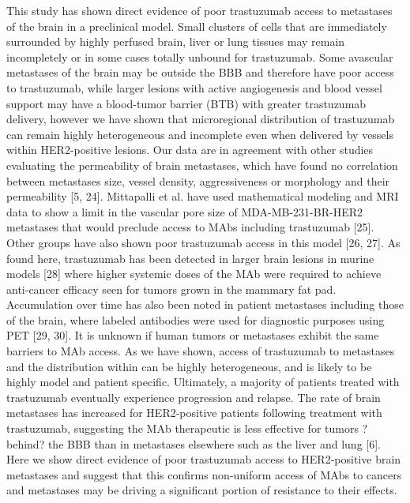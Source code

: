 This study has shown direct evidence of poor trastuzumab access to metastases of the brain in a preclinical model.
Small clusters of cells that are immediately surrounded by highly perfused brain, liver or lung tissues may remain incompletely or in some cases totally unbound for trastuzumab.
Some avascular metastases of the brain may be outside the BBB and therefore have poor access to trastuzumab, while larger lesions with active angiogenesis and blood vessel support may have a blood-tumor barrier (BTB) with greater trastuzumab delivery, however we have shown that microregional distribution of trastuzumab can remain highly heterogeneous and incomplete even when delivered by vessels within HER2-positive lesions.
Our data are in agreement with other studies evaluating the permeability of brain metastases, which have found no correlation between metastases size, vessel density, aggressiveness or morphology and their permeability [5, 24].
Mittapalli et al.
have used mathematical modeling and MRI data to show a limit in the vascular pore size of MDA-MB-231-BR-HER2 metastases that would preclude access to MAbs including trastuzumab [25].
Other groups have also shown poor trastuzumab access in this model [26, 27].
As found here, trastuzumab has been detected in larger brain lesions in murine models [28] where higher systemic doses of the MAb were required to achieve anti-cancer efficacy seen for tumors grown in the mammary fat pad.
Accumulation over time has also been noted in patient metastases including those of the brain, where labeled antibodies were used for diagnostic purposes using PET [29, 30].
It is unknown if human tumors or metastases exhibit the same barriers to MAb access.
As we have shown, access of trastuzumab to metastases and the distribution within can be highly heterogeneous, and is likely to be highly model and patient specific.
Ultimately, a majority of patients treated with trastuzumab eventually experience progression and relapse.
The rate of brain metastases has increased for HER2-positive patients following treatment with trastuzumab, suggesting the MAb therapeutic is less effective for tumors ?behind? the BBB than in metastases elsewhere such as the liver and lung [6].
Here we show direct evidence of poor trastuzumab access to HER2-positive brain metastases and suggest that this confirms non-uniform access of MAbs to cancers and metastases may be driving a significant portion of resistance to their effects.

